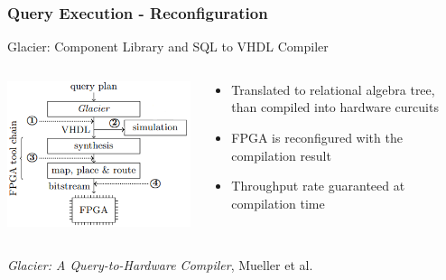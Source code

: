 \documentclass{beamer}
\begin{document}
\begin{frame}
	\frametitle{Query Execution - Reconfiguration}
	Glacier: Component Library and SQL to VHDL Compiler 
	\vspace*{0.2cm}
	\begin{columns}
		\begin{column}{0.48\textwidth}
			\includegraphics[width=1.0\textwidth]{img/glacier_2.png}
		\end{column}
		\begin{column}{0.48\textwidth}
			\begin{itemize}
				\item Translated to relational algebra tree, than compiled into hardware curcuits
				\item FPGA is reconfigured with the compilation result 
				\item Throughput rate guaranteed at compilation time
			\end{itemize}
		\end{column}
	\end{columns}
\vspace*{0.2cm}
	\begin{center}
		\small \emph{Glacier: A Query-to-Hardware Compiler}, Mueller et al.
	\end{center}
\end{frame}
\end{document}
